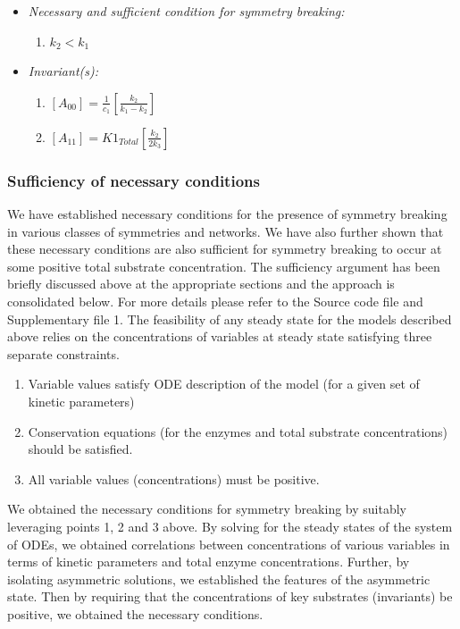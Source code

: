 \documentclass[9pt,lineno]{elife}
\begin{document}
\begin{appendixbox}
\begin{itemize}
    \item \textit{Necessary and sufficient condition for symmetry breaking:}
    \begin{enumerate}
        \item $k_2 < k_1$ 
    \end{enumerate}
        \item \textit{Invariant(s):} 
    \begin{enumerate}
        \item $[A_{00}] = \frac{1}{c_1}\left[\frac{k_2}{k_1-k_2}\right]$
        \item $[A_{11}] = K1_{Total}\left[\frac{k_2}{2k_3}\right]$
    \end{enumerate}
\end{itemize}

\subsubsection*{Sufficiency of necessary conditions}

 We have established necessary conditions for the presence of symmetry breaking in various classes of symmetries and networks. We have also further shown that these necessary conditions are also sufficient for symmetry breaking to occur at some positive total substrate concentration. The sufficiency argument has been briefly discussed above at the appropriate sections and the approach is consolidated below. For more details please refer to the Source code file and Supplementary file 1. The feasibility of any steady state for the models described above relies on the concentrations of variables at steady state satisfying three separate constraints. 

\begin{enumerate}
    \item Variable values satisfy ODE description of the model (for a given set of kinetic parameters)
    \item Conservation equations (for the enzymes and total substrate concentrations) should be satisfied. 
    \item All variable values (concentrations) must be positive. 
\end{enumerate}

We obtained the necessary conditions for symmetry breaking by suitably leveraging points 1, 2 and 3 above. By solving for the steady states of the system of ODEs, we obtained correlations between concentrations of various variables in terms of kinetic parameters and total enzyme concentrations. Further, by isolating  asymmetric solutions, we established the features of the asymmetric state. Then by requiring that the concentrations of key substrates (invariants) be positive, we obtained the necessary conditions. 


\end{appendixbox}
\end{document}
